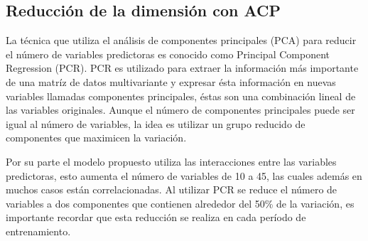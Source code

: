 \documentclass[a4paper,12pt]{Latex/Classes/PhDthesisPSnPDF}
\begin{document}
% 
% 
%   
% 
% 
% 
% 
% 
% 

\subsection{Reducción de la dimensión con ACP}

La técnica que utiliza el análisis de componentes principales (PCA) para reducir el número de variables predictoras es conocido como Principal Component Regression (PCR). PCR es utilizado para extraer la información más importante de una matríz de datos multivariante y expresar ésta información en nuevas variables llamadas componentes principales, éstas son una combinación lineal de las variables originales. Aunque el número de componentes principales puede ser igual al número de variables, la idea es utilizar un grupo reducido de componentes que maximicen la variación.

Por su parte el modelo propuesto utiliza las interacciones entre las variables predictoras, esto aumenta el número de variables de 10 a 45, las cuales además en muchos casos están correlacionadas. Al utilizar PCR se reduce el número de variables a dos componentes que contienen alrededor del 50\% de la variación, es importante recordar que esta reducción se realiza en cada período de entrenamiento.
\end{document}
